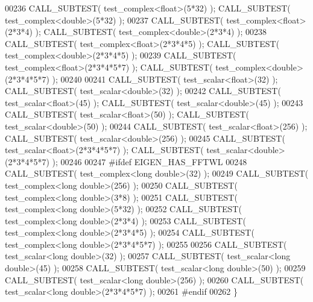 \begin{DoxyCode}
00236   CALL\_SUBTEST( test\_complex<float>(5*32) ); CALL\_SUBTEST( test\_complex<double>(5*32) ); 
00237   CALL\_SUBTEST( test\_complex<float>(2*3*4) ); CALL\_SUBTEST( test\_complex<double>(2*3*4) ); 
00238   CALL\_SUBTEST( test\_complex<float>(2*3*4*5) ); CALL\_SUBTEST( test\_complex<double>(2*3*4*5) ); 
00239   CALL\_SUBTEST( test\_complex<float>(2*3*4*5*7) ); CALL\_SUBTEST( test\_complex<double>(2*3*4*5*7) ); 
00240 
00241   CALL\_SUBTEST( test\_scalar<float>(32) ); CALL\_SUBTEST( test\_scalar<double>(32) ); 
00242   CALL\_SUBTEST( test\_scalar<float>(45) ); CALL\_SUBTEST( test\_scalar<double>(45) ); 
00243   CALL\_SUBTEST( test\_scalar<float>(50) ); CALL\_SUBTEST( test\_scalar<double>(50) ); 
00244   CALL\_SUBTEST( test\_scalar<float>(256) ); CALL\_SUBTEST( test\_scalar<double>(256) ); 
00245   CALL\_SUBTEST( test\_scalar<float>(2*3*4*5*7) ); CALL\_SUBTEST( test\_scalar<double>(2*3*4*5*7) ); 
00246   
00247 \textcolor{preprocessor}{  #ifdef EIGEN\_HAS\_FFTWL}
00248   CALL\_SUBTEST( test\_complex<long double>(32) );
00249   CALL\_SUBTEST( test\_complex<long double>(256) );
00250   CALL\_SUBTEST( test\_complex<long double>(3*8) );
00251   CALL\_SUBTEST( test\_complex<long double>(5*32) );
00252   CALL\_SUBTEST( test\_complex<long double>(2*3*4) );
00253   CALL\_SUBTEST( test\_complex<long double>(2*3*4*5) );
00254   CALL\_SUBTEST( test\_complex<long double>(2*3*4*5*7) );
00255   
00256   CALL\_SUBTEST( test\_scalar<long double>(32) );
00257   CALL\_SUBTEST( test\_scalar<long double>(45) );
00258   CALL\_SUBTEST( test\_scalar<long double>(50) );
00259   CALL\_SUBTEST( test\_scalar<long double>(256) );
00260   CALL\_SUBTEST( test\_scalar<long double>(2*3*4*5*7) );
00261 \textcolor{preprocessor}{  #endif}
00262 \}
\end{DoxyCode}
